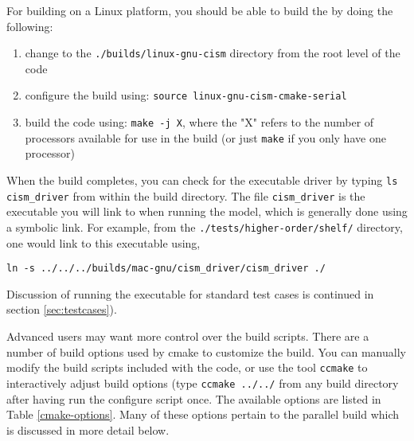 \begin{mdframed}[style=ubuntu] %
For building on a Linux platform, you should be able to build the by doing the following:

\begin{enumerate}
\item{change to the \texttt{./builds/linux-gnu-cism} directory from the root level of the code}
\item{configure the build using: \texttt{source linux-gnu-cism-cmake-serial}}
\item{build the code using: \texttt{make -j X}, where the "X" refers to the number of processors available for use in the build (or just \texttt{make} if you only have one processor)}
\end{enumerate}
\end{mdframed}                 %

When the build completes, you can check for the executable driver by typing \texttt{ls cism\_driver} from within the build directory. The file \texttt{cism\_driver} is the executable you will link to when running the model, which is generally done using a symbolic link. For example, from the \texttt{./tests/higher-order/shelf/} directory, one would link to this executable using, 

\begin{verbatim}
ln -s ../../../builds/mac-gnu/cism_driver/cism_driver ./
\end{verbatim}

Discussion of running the executable for standard test cases is continued in section \ref{sec:testcases}). 


Advanced users may want more control over the build scripts.  There are a number of
build options used by cmake to customize the build.  You can manually modify the 
build scripts included with the code, or use the tool \texttt{ccmake} to 
interactively adjust build options (type \texttt{ccmake ../../} from any build directory
after having run the configure script once.  The available options are listed in Table \ref{cmake-options}.
Many of these options pertain to the parallel build which is discussed in more detail below.


